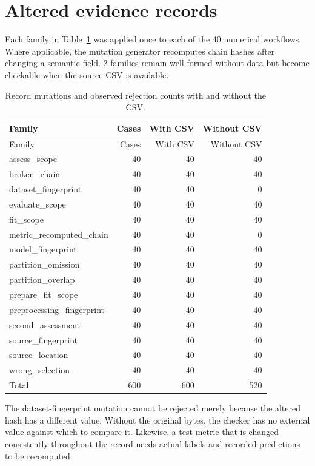 \documentclass[11pt,letterpaper]{article}
\begin{document}
\section{Altered evidence records}
Each family in Table~\ref{tab:mutations} was applied once to each of the 40 numerical workflows. Where applicable, the mutation generator recomputes chain hashes after changing a semantic field. 2 families remain well formed without data but become checkable when the source CSV is available.

\begin{longtable}{p{}rrr}
\caption{Record mutations and observed rejection counts with and without the CSV.}\label{tab:mutations}\\
\toprule Family & Cases & With CSV & Without CSV\\\midrule\endfirsthead
\toprule Family & Cases & With CSV & Without CSV\\\midrule\endhead
assess\_scope & 40 & 40 & 40\\
broken\_chain & 40 & 40 & 40\\
dataset\_fingerprint & 40 & 40 & 0\\
evaluate\_scope & 40 & 40 & 40\\
fit\_scope & 40 & 40 & 40\\
metric\_recomputed\_chain & 40 & 40 & 0\\
model\_fingerprint & 40 & 40 & 40\\
partition\_omission & 40 & 40 & 40\\
partition\_overlap & 40 & 40 & 40\\
prepare\_fit\_scope & 40 & 40 & 40\\
preprocessing\_fingerprint & 40 & 40 & 40\\
second\_assessment & 40 & 40 & 40\\
source\_fingerprint & 40 & 40 & 40\\
source\_location & 40 & 40 & 40\\
wrong\_selection & 40 & 40 & 40\\
\midrule Total & 600 & 600 & 520\\\bottomrule
\end{longtable}
The dataset-fingerprint mutation cannot be rejected merely because the altered hash has a different value. Without the original bytes, the checker has no external value against which to compare it. Likewise, a test metric that is changed consistently throughout the record needs actual labels and recorded predictions to be recomputed.
\end{document}

